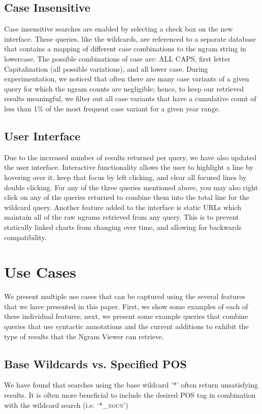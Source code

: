 \documentclass[11pt]{article}
\begin{document}
\subsection{Case Insensitive}
Case insensitive searches are enabled by selecting a check box on the new interface. These queries, like the wildcards, are referenced to a separate database that contains a mapping of different case combinations to the ngram string in lowercase. The possible combinations of case are: ALL CAPS, first letter Capitalization (all possible variations), and all lower case. During experimentation, we noticed that often there are many case variants of a given query for which the ngram counts are negligible; hence, to keep our retrieved results meaningful, we filter out all case variants that have a cumulative count of less than 1\% of the most frequent case variant for a given year range.



\subsection{User Interface}
\label{sec:userint}
Due to the increased number of results returned per query, we have also updated the user interface. Interactive functionality allows the user to highlight a line by hovering over it, keep that focus by left clicking, and clear all focused lines by double clicking. For any of the three queries mentioned above, you may also right click on any of the queries returned to combine them into the total line for the wildcard query. Another feature added to the interface is static URLs which maintain all of the raw ngrams retrieved from any query. This is to prevent statically linked charts from changing over time, and allowing for backwards compatibility.


\section{Use Cases}
\label{sec:usecases}
We present multiple use cases that can be captured using the several features that we have presented in this paper. First, we show some examples of each of these individual features; next, we present some example queries that combine queries that use syntactic annotations and the current additions to exhibit the type of results that the Ngram Viewer can retrieve.

\subsection{Base Wildcards vs. Specified POS}
We have found that searches using the base wildcard '*' often return unsatisfying results. It is often more beneficial to include the desired POS tag in combination with the wildcard search (i.e. `*\textsf{\textsc{\_noun}}')
\end{document}
